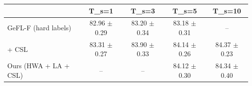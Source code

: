 \begin{tabular}{lcccc}
\toprule
 & T_s=1 & T_s=3 & T_s=5 & T_s=10 \\
\midrule
GeFL-F (hard labels) & 82.96 $\pm$ 0.29 & 83.20 $\pm$ 0.34 & 83.18 $\pm$ 0.31 & -- \\
+ CSL & 83.31 $\pm$ 0.27 & 83.90 $\pm$ 0.33 & 84.14 $\pm$ 0.26 & 84.37 $\pm$ 0.23 \\
Ours (HWA + LA + CSL) & -- & -- & 84.12 $\pm$ 0.30 & 84.34 $\pm$ 0.40 \\
\bottomrule
\end{tabular}
